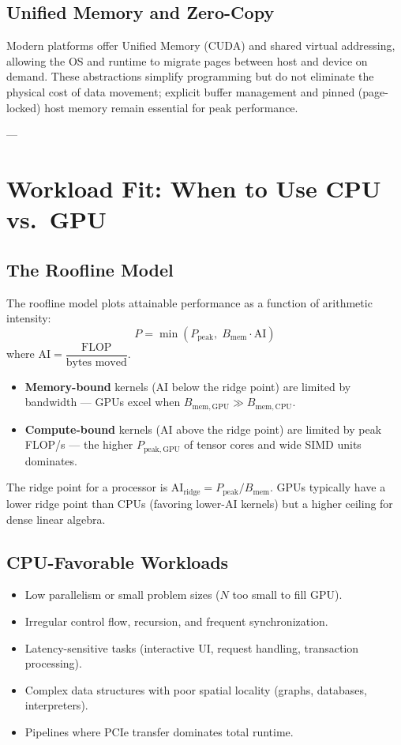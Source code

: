 \documentclass[11pt,journal,onecolumn]{IEEEtran}
\begin{document}
\subsection{Unified Memory and Zero-Copy}
Modern platforms offer Unified Memory (CUDA) and shared virtual addressing, allowing the OS and runtime to migrate pages between host and device on demand. These abstractions simplify programming but do not eliminate the physical cost of data movement; explicit buffer management and pinned (page-locked) host memory remain essential for peak performance.

---

\section{Workload Fit: When to Use CPU vs.\ GPU}

\subsection{The Roofline Model}
The roofline model plots attainable performance as a function of arithmetic intensity:
\begin{equation}
P = \min\!\left(P_{\mathrm{peak}},\; B_{\mathrm{mem}} \cdot \mathrm{AI}\right)
\end{equation}
where $\mathrm{AI} = \dfrac{\text{FLOP}}{\text{bytes moved}}$.

\begin{itemize}
    \item \textbf{Memory-bound} kernels ($\mathrm{AI}$ below the ridge point) are limited by bandwidth --- GPUs excel when $B_{\mathrm{mem,GPU}} \gg B_{\mathrm{mem,CPU}}$.
    \item \textbf{Compute-bound} kernels ($\mathrm{AI}$ above the ridge point) are limited by peak FLOP/s --- the higher $P_{\mathrm{peak,GPU}}$ of tensor cores and wide SIMD units dominates.
\end{itemize}

The ridge point for a processor is $ \mathrm{AI}_{\mathrm{ridge}} = P_{\mathrm{peak}} / B_{\mathrm{mem}}$. GPUs typically have a lower ridge point than CPUs (favoring lower-AI kernels) but a higher ceiling for dense linear algebra.

\subsection{CPU-Favorable Workloads}
\begin{itemize}
    \item Low parallelism or small problem sizes ($N$ too small to fill GPU).
    \item Irregular control flow, recursion, and frequent synchronization.
    \item Latency-sensitive tasks (interactive UI, request handling, transaction processing).
    \item Complex data structures with poor spatial locality (graphs, databases, interpreters).
    \item Pipelines where PCIe transfer dominates total runtime.
\end{itemize}
\end{document}
